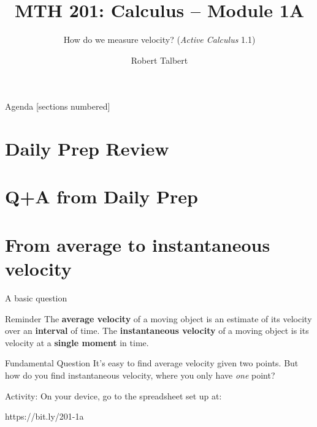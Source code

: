 \documentclass[10pt]{beamer}
\title{MTH 201: Calculus -- Module 1A}
\subtitle{How do we measure velocity? (\emph{Active Calculus} 1.1)}
\date{}
\author{Robert Talbert}
\institute{Grand Valley State University}
\begin{document}
\maketitle

\begin{frame}{Agenda}
  [sections numbered]
  \tableofcontents%
\end{frame}





 \section[Review of Daily Prep]{Daily Prep Review}


\section[Q+A]{Q+A from Daily Prep}

\section[From average to instantaneous velocity]{From average to instantaneous velocity}

\begin{frame}{A basic question}

\begin{block}{Reminder}
    The \textbf{average velocity} of a moving object is an estimate of its velocity over an \textbf{interval} of time. The \textbf{instantaneous velocity} of a moving object is its velocity at a \textbf{single moment} in time. 
\end{block}

\begin{alertblock}{Fundamental Question}
    It's easy to find average velocity given two points. But how do you find instantaneous velocity, where you only have \emph{one} point? 
\end{alertblock}

Activity: On your device, go to the spreadsheet set up at: 

\begin{center}
    https://bit.ly/201-1a
\end{center}

\end{frame}
\end{document}
